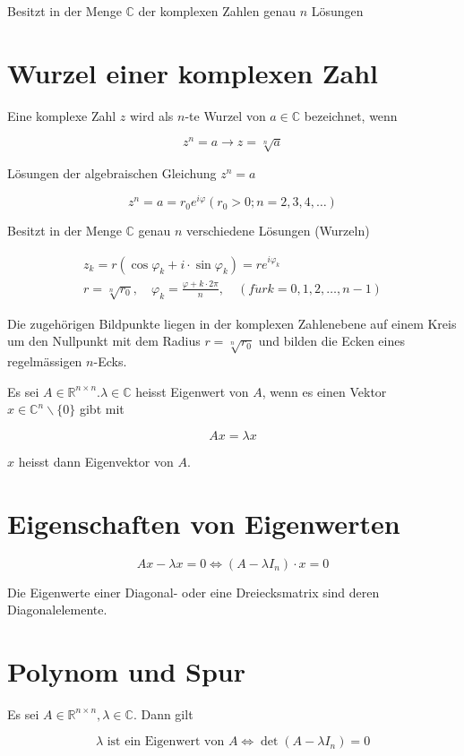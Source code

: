 \documentclass[10pt]{article}
\begin{document}
Besitzt in der Menge $\mathbb{C}$ der komplexen Zahlen genau $n$ Lösungen

\section*{Wurzel einer komplexen Zahl}
Eine komplexe Zahl $z$ wird als $n$-te Wurzel von $a \in \mathbb{C}$ bezeichnet, wenn

$$
z^{n}=a \rightarrow z=\sqrt[n]{a}
$$

Lösungen der algebraischen Gleichung $z^{n}=a$

$$
z^{n}=a=r_{0} e^{i \varphi}\left(r_{0}>0 ; n=2,3,4, \ldots\right)
$$

Besitzt in der Menge $\mathbb{C}$ genau $n$ verschiedene Lösungen (Wurzeln)

$$
\begin{gathered}
z_{k}=r\left(\cos \varphi_{k}+i \cdot \sin \varphi_{k}\right)=r e^{i \varphi_{k}} \\
r=\sqrt[n]{r_{0}}, \quad \varphi_{k}=\frac{\varphi+k \cdot 2 \pi}{n}, \quad(f \ddot{u} r k=0,1,2, \ldots, n-1)
\end{gathered}
$$

Die zugehörigen Bildpunkte liegen in der komplexen Zahlenebene auf einem Kreis um den Nullpunkt mit dem Radius $r=\sqrt[n]{r_{0}}$ und bilden die Ecken eines regelmässigen $n$-Ecks.

Es sei $A \in \mathbb{R}^{n \times n} . \lambda \in \mathbb{C}$ heisst Eigenwert von $A$, wenn es einen Vektor $x \in \mathbb{C}^{n} \backslash\{0\}$ gibt mit

$$
A x=\lambda x
$$

$x$ heisst dann Eigenvektor von $A$.

\section*{Eigenschaften von Eigenwerten}
$$
A x-\lambda x=0 \Leftrightarrow\left(A-\lambda I_{n}\right) \cdot x=0
$$

Die Eigenwerte einer Diagonal- oder eine Dreiecksmatrix sind deren Diagonalelemente.

\section*{Polynom und Spur}
Es sei $A \in \mathbb{R}^{n \times n}, \lambda \in \mathbb{C}$. Dann gilt

$$
\lambda \text { ist ein Eigenwert von } A \Leftrightarrow \operatorname{det}\left(A-\lambda I_{n}\right)=0
$$
\end{document}
